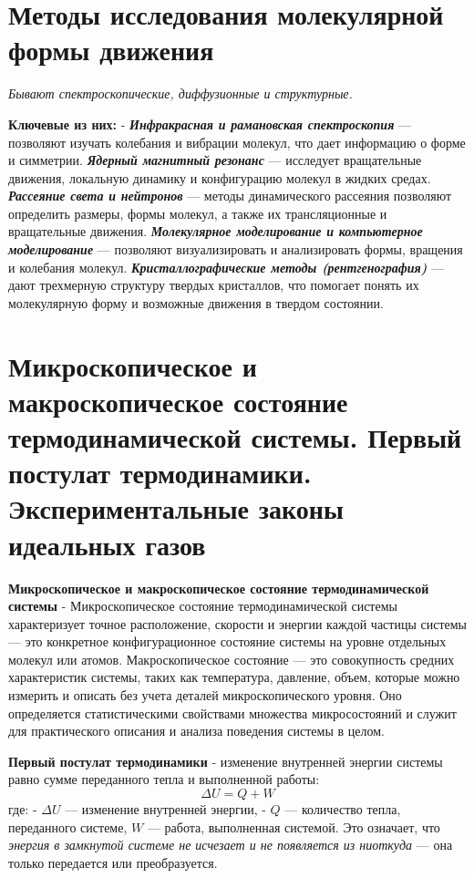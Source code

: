 \documentclass[14pt]{article}
\begin{document}
    \section{Методы исследования молекулярной формы движения}
    \textit{Бывают спектроскопические, диффузионные и структурные.} 
    
    \textbf{Ключевые из них:} - 
    \newline \textbf{\textit{Инфракрасная и рамановская спектроскопия}} — позволяют изучать колебания и вибрации молекул, что дает информацию о форме и симметрии. 
    \newline \textbf{\textit{Ядерный магнитный резонанс}}  — исследует вращательные движения, локальную динамику и конфигурацию молекул в жидких средах.
    \newline \textbf{\textit{Рассеяние света и нейтронов}}  — методы динамического рассеяния позволяют определить размеры, формы молекул, а также их трансляционные и вращательные движения.
    \newline \textbf{\textit{Молекулярное моделирование и компьютерное моделирование}}  — позволяют визуализировать и анализировать формы, вращения и колебания молекул. 
    \newline \textbf{\textit{Кристаллографические методы (рентгенография)}}  — дают трехмерную структуру твердых кристаллов, что помогает понять их молекулярную форму и возможные движения в твердом состоянии.

    \section{Микроскопическое и макроскопическое состояние термодинамической системы. Первый постулат термодинамики. Экспериментальные законы идеальных газов}
    \textbf{Микроскопическое и макроскопическое состояние термодинамической системы}
    \newline - Микроскопическое состояние термодинамической системы характеризует точное расположение, скорости и энергии каждой частицы системы — это конкретное конфигурационное состояние системы на уровне отдельных молекул или атомов. Макроскопическое состояние — это совокупность средних характеристик системы, таких как температура, давление, объем, которые можно измерить и описать без учета деталей микроскопического уровня. Оно определяется статистическими свойствами множества микросостояний и служит для практического описания и анализа поведения системы в целом.
    
    \textbf{Первый постулат термодинамики}
    \newline - изменение внутренней энергии системы равно сумме переданного тепла и выполненной работы: \[ \Delta U = Q + W \] где: - \(\Delta U\) — изменение внутренней энергии, - \(Q\) — количество тепла, переданного системе, 
    \newline \(W\) — работа, выполненная системой.
    \newline Это означает, что \textit{энергия в замкнутой системе не исчезает и не появляется из ниоткуда}  — она только передается или преобразуется.
\end{document}
